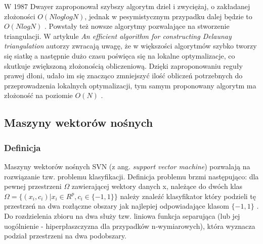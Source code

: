 W 1987 Dwayer zaproponował szybszy algorytm dziel i zwyciężaj, o zakładanej złożoności $O(N log log N)$, jednak w pesymistycznym przypadku dalej będzie to $O(N log N)$  \cite{Dwyer1987}. Powstały też nowsze algorytmy pozwalające na stworzenie triangulacji. W artykule \textsl{An efficient algorithm for constructing Delaunay triangulation} autorzy zwracają uwagę, że w większości algorytmów szybko tworzy się siatkę a następnie dużo czasu poświęca się na lokalne optymalizacje, co skutkuje zwiększoną złożonością obliczeniową. Dzięki zaproponowaniu reguły prawej dłoni, udało im się znacząco zmniejszyć ilość obliczeń potrzebnych do przeprowadzenia lokalnych optymalizacji, tym samym proponowany algorytm ma złożoność na poziomie $O(N)$ \cite{jiang2010}.

\subsection{Maszyny wektorów nośnych}

\subsubsection{Definicja} 
Maszyny wektorów nośnych SVN (z ang. \textit{support vector machine}) pozwalają na rozwiązanie tzw. problemu klasyfikacji. Definicja problemu brzmi następująco: dla pewnej przestrzeni $\Omega$ zawierającej wektory danych x, należące do dwóch klas
$\Omega = \{(x_{i}, c_{i}) | x_{i} \in R^p, c_{i} \in \{-1,1\}\}$
należy znaleźć klasyfikator który podzieli tę przestrzeń na dwa rozłączne obszary jak najlepiej odpowiadające klasom $\{-1, 1\}$ \cite{stefanowski2010}. Do rozdzielenia zbioru na dwa służy tzw. liniowa funkcja separująca (lub jej uogólnienie - hiperpłaszczyzna dla przypadków n-wymiarowych), która wyznacza podział przestrzeni na dwa podobszary.

